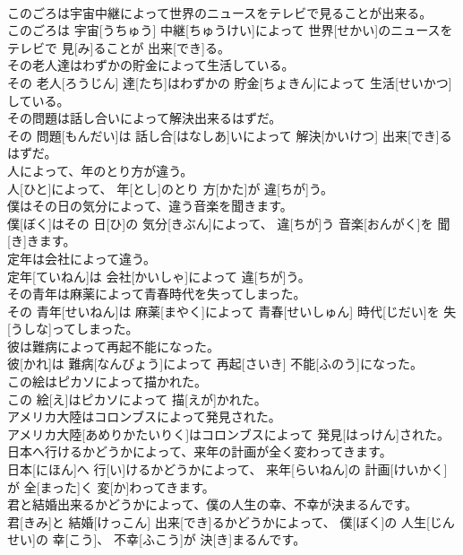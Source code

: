 \documentclass[8pt]{extreport}
\begin{document}
\begin{CJK}{UTF8}{min}
\\	このごろは宇宙中継によって世界のニュースをテレビで見ることが出来る。	
\\	このごろは 宇宙[うちゅう] 中継[ちゅうけい]によって 世界[せかい]のニュースをテレビで 見[み]ることが 出来[でき]る。
\\	その老人達はわずかの貯金によって生活している。	
\\	その 老人[ろうじん] 達[たち]はわずかの 貯金[ちょきん]によって 生活[せいかつ]している。
\\	その問題は話し合いによって解決出来るはずだ。	
\\	その 問題[もんだい]は 話し合[はなしあ]いによって 解決[かいけつ] 出来[でき]るはずだ。
\\	人によって、年のとり方が違う。	
\\	人[ひと]によって、 年[とし]のとり 方[かた]が 違[ちが]う。
\\	僕はその日の気分によって、違う音楽を聞きます。	
\\	僕[ぼく]はその 日[ひ]の 気分[きぶん]によって、 違[ちが]う 音楽[おんがく]を 聞[き]きます。
\\	定年は会社によって違う。	
\\	定年[ていねん]は 会社[かいしゃ]によって 違[ちが]う。
\\	その青年は麻薬によって青春時代を失ってしまった。	
\\	その 青年[せいねん]は 麻薬[まやく]によって 青春[せいしゅん] 時代[じだい]を 失[うしな]ってしまった。
\\	彼は難病によって再起不能になった。	
\\	彼[かれ]は 難病[なんびょう]によって 再起[さいき] 不能[ふのう]になった。
\\	この絵はピカソによって描かれた。	
\\	この 絵[え]はピカソによって 描[えが]かれた。
\\	アメリカ大陸はコロンブスによって発見された。	
\\	アメリカ大陸[あめりかたいりく]はコロンブスによって 発見[はっけん]された。
\\	日本へ行けるかどうかによって、来年の計画が全く変わってきます。	
\\	日本[にほん]へ 行[い]けるかどうかによって、 来年[らいねん]の 計画[けいかく]が 全[まった]く 変[か]わってきます。
\\	君と結婚出来るかどうかによって、僕の人生の幸、不幸が決まるんです。	
\\	君[きみ]と 結婚[けっこん] 出来[でき]るかどうかによって、 僕[ぼく]の 人生[じんせい]の 幸[こう]、 不幸[ふこう]が 決[き]まるんです。

\end{CJK}
\end{document}
